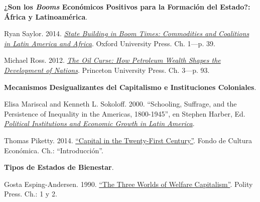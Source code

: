 \documentclass[letterpaper]{article}
\renewenvironment{itemize}{
  \begin{list}{}{
    \setlength{\leftmargin}{1.5em}
  }
}{
  \end{list}
}
\begin{document}
\begin{enumerate}[label=\roman*.]
\begin{itemize}
      \item[14.] {\bf ¿Son los \emph{Booms} Econ\'omicos Positivos para la Formaci\'on del Estado?: \'Africa y Latinoam\'erica}.
        \begin{itemize}
          \item[$\circ$] Ryan Saylor. 2014. \href{https://github.com/hbahamonde/Ciencia_Politica_II/raw/master/Readings/Saylor.pdf}{\emph{State Building in Boom Times: Commodities and Coalitions in Latin America and Africa}}. Oxford University Press. Ch. 1---p. 39.
          
          \item[$\circ$] Michael Ross. 2012. \href{https://github.com/hbahamonde/Ciencia_Politica_II/raw/master/Readings/Ross_2012.epub}{\emph{The Oil Curse: How Petroleum Wealth Shapes the Development of Nations}}. Princeton University Press. Ch. 3---p. 93.
        \end{itemize}

		\end{itemize}



	\item {}
		\begin{itemize}

			\item[15.] {\bf Mecanismos Desigualizantes del Capitalismo e Instituciones Coloniales}.
				\begin{itemize}
					\item[$\circ$] Elisa Mariscal and Kenneth L. Sokoloff. 2000. ``Schooling, Suffrage, and the Persistence of Inequality in the Americas, 1800-1945'', en Stephen Harber, Ed. \href{https://github.com/hbahamonde/Ciencia_Politica_II/raw/master/Readings/Political_Institutions_Haber.pdf}{\emph{Political Institutions and Economic Growth in Latin America}}.
          \item[$\circ$] Thomas Piketty. 2014.  \href{https://github.com/hbahamonde/Ciencia_Politica_II/raw/master/Readings/Piketty_El_capital.pdf}{``Capital in the Twenty-First Century''}. Fondo de Cultura Econ\'omica. Ch.: ``Introducci\'on''.
				\end{itemize}


			\item[16.] {\bf Tipos de Estados de Bienestar}.
				\begin{itemize}
          \item[$\circ$] Gosta Esping-Andersen. 1990. \href{https://github.com/hbahamonde/Ciencia_Politica_II/raw/master/Readings/Esping_Andersen.pdf}{``The Three Worlds of Welfare Capitalism''}. Polity Press. Ch.: 1 y 2.
        \end{itemize}



\end{itemize}
\end{enumerate}
\end{document}
